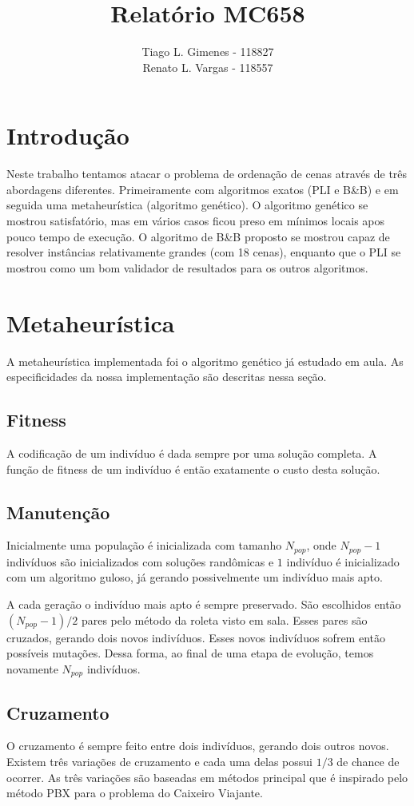 \documentclass[a4paper,11pt]{article}
\title{Relatório MC658}
\author{Tiago L. Gimenes - 118827\\
        Renato L. Vargas - 118557}
\begin{document}
\maketitle

\section*{Introdução}
Neste trabalho tentamos atacar o problema de ordenação de cenas através de três
abordagens diferentes. Primeiramente com algoritmos exatos (PLI e B\&B) e em seguida
uma metaheurística (algoritmo genético). O algoritmo genético se mostrou satisfatório,
mas em vários casos ficou preso em mínimos locais apos pouco tempo de execução. O algoritmo de B\&B
proposto se mostrou capaz de resolver instâncias relativamente grandes (com 18 cenas),
enquanto que o PLI se mostrou como um bom validador de resultados para os outros
algoritmos.

\section{Metaheurística}
A metaheurística implementada foi o algoritmo genético já estudado em aula.
As especificidades da nossa implementação são descritas nessa seção.

\subsection{Fitness}
A codificação de um indivíduo é dada sempre por uma solução completa.
A função de fitness de um indivíduo é então exatamente o custo desta solução.

\subsection{Manutenção}
Inicialmente uma população é inicializada com tamanho $N_{pop}$, onde $N_{pop}-1$ indivíduos são
inicializados com soluções randômicas e $1$ indivíduo é inicializado com um algoritmo
guloso, já gerando possivelmente um indivíduo mais apto.

A cada geração o indivíduo mais apto é sempre preservado. São escolhidos então $(N_{pop}-1)/2$
pares pelo método da roleta visto em sala. Esses pares são cruzados, gerando dois novos
indivíduos. Esses novos indivíduos sofrem então possíveis mutações. Dessa forma, ao final
de uma etapa de evolução, temos novamente $N_{pop}$ indivíduos.

\subsection{Cruzamento}
O cruzamento é sempre feito entre dois indivíduos, gerando dois outros novos.
Existem três variações de cruzamento e cada uma delas possui $1/3$ de chance de ocorrer.
As três variações são baseadas em métodos principal que é inspirado pelo método PBX
para o problema do Caixeiro Viajante.
\end{document}
